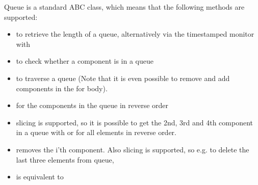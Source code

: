 \documentclass[letterpaper,10pt,english]{sphinxmanual}
\begin{document}
Queue is a standard ABC class, which means that the following methods are supported:
\begin{itemize}
\item {} 
 to retrieve the length of a queue, alternatively via the timestamped monitor with 

\item {} 
 to check whether a component is in a queue

\item {} 
 to traverse a queue (Note that it is even possible to remove and add components in the for body).

\item {} 
 for the components in the queue in reverse order

\item {} 
slicing is supported, so it is possible to get the 2nd, 3rd and 4th component in a queue with  or 
for all elements in reverse order.

\item {} 
 removes the i’th component. Also slicing is supported, so e.g. to delete the last three elements from queue,

\item {} 
 is equivalent to 

\end{itemize}
\end{document}
